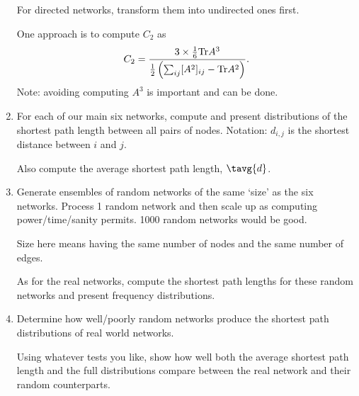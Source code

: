 \begin{enumerate}
  For directed networks, transform them into undirected ones
  first.
  
  One approach is to compute $C_{2}$ as
  $$
  C_{2}
  =
  \frac{
    3
    \times
    \frac{1}{6}{\rm Tr} A^{3} 
  }
  {
    \frac{1}{2}
    \left(
      \sum_{ij} [A^{2}]_{ij}
      -
      {\rm Tr} A^{2}
    \right)
  }.
  $$
  Note: avoiding computing $A^{3}$ is important
  and can be done.

 


  
   \solutionstart


   \solutionend

\item
  For each of our main six networks, compute and present distributions of the shortest
  path length 
  between all pairs of nodes.
  Notation: $d_{i,j}$ is the shortest distance between $i$ and $j$.

  Also compute the average shortest path length, 
  $\tavg{d}$.

  
   \solutionstart


   \solutionend

\item
  Generate ensembles of random networks of the same `size' as
  the six networks.  Process 1 random network and 
  then scale up as computing power/time/sanity permits.
  1000 random networks would be good.

  Size here means having the same number of
  nodes and the same number of edges.

  As for the real networks, compute the
  shortest path lengths for these random networks
  and present frequency distributions.

  
   \solutionstart


   \solutionend

\item
  Determine how well/poorly random networks produce
  the shortest path distributions of real world networks.

  Using whatever tests you like, show how well
  both the average shortest path length and
  the full distributions compare between
  the real network and their random counterparts.

  
   \solutionstart


\end{enumerate}
